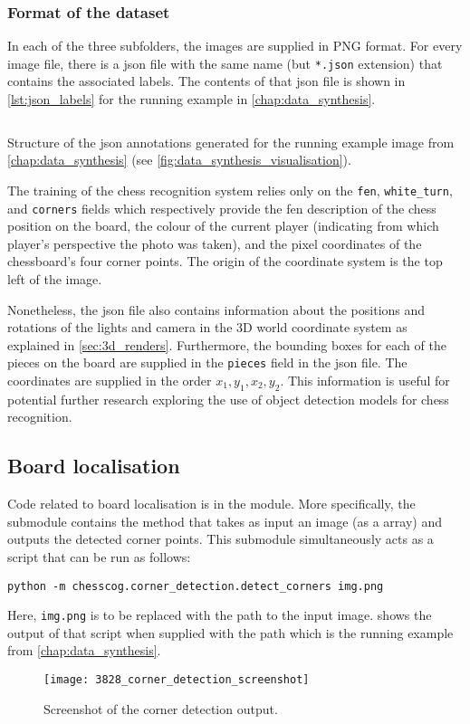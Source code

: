 \documentclass[../../report.tex]{subfiles}
\begin{document}
\subsubsection{Format of the dataset}
In each of the three subfolders, the images are supplied in PNG format.
For every image file, there is a \gls{json} file with the same name (but \texttt{*.json} extension) that contains the associated labels.
The contents of that \gls{json} file is shown in \cref{lst:json_labels} for the running example in \cref{chap:data_synthesis}.
\begin{listing}
    \inputminted{json}{\subfix{../../data/3828.json}}
    \caption[Structure of the \acs{json} annotations generated for the running example image from \cref{chap:data_synthesis}.]{Structure of the \acs{json} annotations generated for the running example image from \cref{chap:data_synthesis} (see \cref{fig:data_synthesis_visualisation}).}
    \label{lst:json_labels}
\end{listing}
The training of the chess recognition system relies only on the \texttt{fen}, \texttt{white\_turn}, and \texttt{corners} fields which respectively provide the \gls{fen} description of the chess position on the board, the colour of the current player (indicating from which player's perspective the photo was taken), and the pixel coordinates of the chessboard's four corner points.
The origin of the coordinate system is the top left of the image.

Nonetheless, the \gls{json} file also contains information about the positions and rotations of the lights and camera in the 3D world coordinate system as explained in \cref{sec:3d_renders}.
Furthermore, the bounding boxes for each of the pieces on the board are supplied in the \texttt{pieces} field in the \gls{json} file.
The coordinates are supplied in the order $x_1,y_1,x_2,y_2$.
This information is useful for potential further research exploring the use of object detection models for chess recognition.

\subsection{Board localisation}
Code related to board localisation is in the  module.
More specifically, the  submodule contains the  method that takes as input an image (as a  array) and outputs the detected corner points.
This submodule simultaneously acts as a script that can be run as follows:
\begin{verbatim}
python -m chesscog.corner_detection.detect_corners img.png
\end{verbatim}
Here, \texttt{img.png} is to be replaced with the path to the input image.
 shows the output of that script when supplied with the path  which is the running example from \cref{chap:data_synthesis}.
\begin{figure}
    \centering
    \texttt{[image: 3828\_corner\_detection\_screenshot]}
    \caption{Screenshot of the corner detection output.}
    \label{fig:example_detect_corners}
\end{figure}
\end{document}

